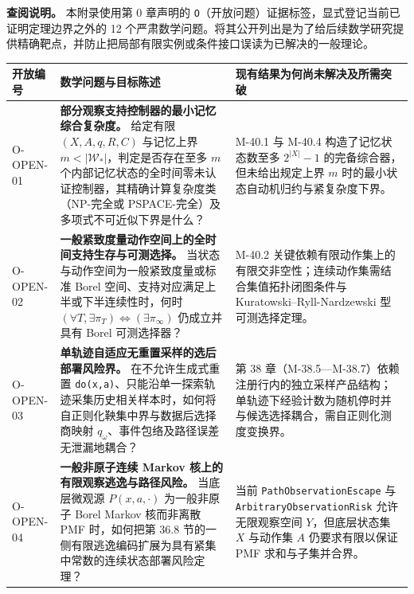\documentclass[
  11pt,
  oneside]{book}
\newcounter{none} %
\begin{document}
\textbf{查阅说明。} 本附录使用第 0 章声明的 \texttt{O}（开放问题）证据标签，显式登记当前已证明定理边界之外的 12 个严肃数学问题。将其公开列出是为了给后续数学研究提供精确靶点，并防止把局部有限实例或条件接口误读为已解决的一般理论。

{\def\LTcaptype{none} %
\begin{longtable}[]{@{}
  >{\raggedright\arraybackslash}p{}
  >{\raggedright\arraybackslash}p{}
  >{\raggedright\arraybackslash}p{}@{}}
\toprule\noalign{}
\begin{minipage}[b]{\linewidth}\raggedright
开放编号
\end{minipage} & \begin{minipage}[b]{\linewidth}\raggedright
数学问题与目标陈述
\end{minipage} & \begin{minipage}[b]{\linewidth}\raggedright
现有结果为何尚未解决及所需突破
\end{minipage} \\
\midrule\noalign{}
\endhead
\bottomrule\noalign{}
\endlastfoot
O-OPEN-01 & \textbf{部分观察支持控制器的最小记忆综合复杂度。} 给定有限 \((X,A,q,R,C)\) 与记忆上界 \(m<|\mathcal W_*|\)，判定是否存在至多 \(m\) 个内部记忆状态的全时间零未认证控制器，其精确计算复杂度类（NP-完全或 PSPACE-完全）及多项式不可近似下界是什么？ & M-40.1 与 M-40.4 构造了记忆状态数至多 \(2^{|X|}-1\) 的完备综合器，但未给出规定上界 \(m\) 时的最小状态自动机归约与紧复杂度下界。 \\
O-OPEN-02 & \textbf{一般紧致度量动作空间上的全时间支持生存与可测选择。} 当状态与动作空间为一般紧致度量或标准 Borel 空间、支持对应满足上半或下半连续性时，何时 \((\forall T,\exists\pi_T)\iff(\exists\pi_\infty)\) 仍成立并具有 Borel 可测选择器？ & M-40.2 关键依赖有限动作集上的有限交非空性；连续动作集需结合集值拓扑闭图条件与 Kuratowski--Ryll-Nardzewski 型可测选择定理。 \\
O-OPEN-03 & \textbf{单轨迹自适应无重置采样的选后部署风险界。} 在不允许生成式重置 \texttt{do(x,a)}、只能沿单一探索轨迹采集历史相关样本时，如何将自正则化鞅集中界与数据后选择商映射 \(q_\omega\)、事件包络及路径误差无泄漏地耦合？ & 第 38 章（M-38.5---M-38.7）依赖注册行内的独立采样产品结构；单轨迹下经验计数为随机停时并与候选选择耦合，需自正则化测度变换界。 \\
O-OPEN-04 & \textbf{一般非原子连续 Markov 核上的有限观察逃逸与路径风险。} 当底层微观源 \(P(x,a,\cdot)\) 为一般非原子 Borel Markov 核而非离散 PMF 时，如何把第 36.8 节的一侧有限逃逸编码扩展为具有紧集中常数的连续状态部署风险定理？ & 当前 \nolinkurl{PathObservationEscape} 与 \nolinkurl{ArbitraryObservationRisk} 允许无限观察空间 \(Y\)，但底层状态集 \(X\) 与动作集 \(A\) 仍要求有限以保证 PMF 求和与子集并合界。 \\

\end{longtable}}
\end{document}
